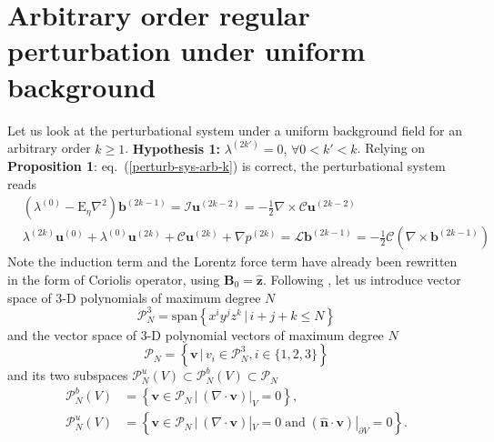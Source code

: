 \section{Arbitrary order regular perturbation under uniform background}

Let us look at the perturbational system under a uniform background field for an arbitrary order $k\geq 1$. {\todoremark \textbf{Hypothesis 1:} $\lambda^{(2k')} = 0$, $\forall 0 < k' < k$}. Relying on {\todoremark \textbf{Proposition 1}: eq.~(\ref{perturb-sys-arb-k}) is correct}, the perturbational system reads
%
\begin{equation}
    \begin{aligned}
        & \left(\lambda^{(0)} - \mathrm{E}_\eta \nabla^2\right) \mathbf{b}^{(2k-1)} = \mathcal{I} \mathbf{u}^{(2k-2)} = - \frac{1}{2} \nabla\times \mathcal{C} \mathbf{u}^{(2k-2)} \\
        & \lambda^{(2k)} \mathbf{u}^{(0)} + \lambda^{(0)} \mathbf{u}^{(2k)} + \mathcal{C} \mathbf{u}^{(2k)} + \nabla p^{(2k)} = \mathcal{L} \mathbf{b}^{(2k-1)} = -\frac{1}{2} \mathcal{C} \left(\nabla\times \mathbf{b}^{(2k-1)}\right)
    \end{aligned}
\end{equation}
%
Note the induction term and the Lorentz force term have already been rewritten in the form of Coriolis operator, using $\mathbf{B}_0 = \hat{\mathbf{z}}$. Following \citet{ivers_enumeration_2015}, let us introduce vector space of 3-D polynomials of maximum degree $N$
%
\begin{equation}
    \mathcal{P}_N^3 = \mathrm{span} \left\{x^i y^j z^k \, \Big| \, i + j + k \leq N\right\}
\end{equation}
%
and the vector space of 3-D polynomial vectors of maximum degree $N$
%
\begin{equation}
    \boldsymbol{\mathcal{P}}_N = \left\{\mathbf{v} \, \Big| \, v_i \in \mathcal{P}_N^3, i \in \{1, 2, 3\}\right\}
\end{equation}
%
and its two subspaces $\boldsymbol{\mathcal{P}}_N^u(V) \subset \boldsymbol{\mathcal{P}}_N^b(V) \subset \boldsymbol{\mathcal{P}}_N$
%
\begin{align}
    \boldsymbol{\mathcal{P}}_N^b(V) &= \left\{\mathbf{v} \in \boldsymbol{\mathcal{P}}_N \, \Big| \, (\nabla\cdot \mathbf{v})|_{V} = 0\right\},
    \\
    \boldsymbol{\mathcal{P}}_N^u(V) &= \left\{\mathbf{v} \in \boldsymbol{\mathcal{P}}_N \, \Big| \, (\nabla\cdot \mathbf{v})|_{V} = 0 \; \text{and} \; (\hat{\mathbf{n}}\cdot \mathbf{v})|_{\partial V} = 0\right\}.
\end{align}
